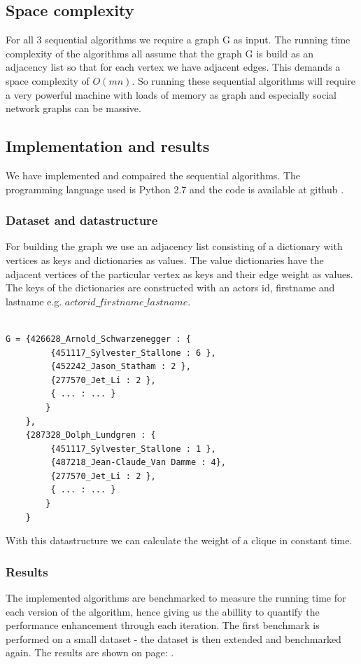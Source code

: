 \documentclass{article}
\begin{document}
\subsection{Space complexity}
For all 3 sequential algorithms we require a graph G as input. The running time complexity of the algorithms all assume that the graph G is build as an adjacency list so that for each vertex we have adjacent edges. This demands a space complexity of $O(mn)$. So running these sequential algorithms will require a very powerful machine with loads of memory as graph and especially social network graphs can be massive.


\subsection{Implementation and results}
We have implemented and compaired the sequential algorithms. The programming language used is Python 2.7 and the code is available at github \cite{gitcode}.

\subsubsection{Dataset and datastructure}
For building the graph we use an adjacency list consisting of a dictionary with vertices as keys and dictionaries as values. The value dictionaries have the adjacent vertices of the particular vertex as keys and their edge weight as values. The keys of the dictionaries are constructed with an actors id, firstname and lastname e.g. $actorid\_firstname\_lastname$.

\begin{lstlisting}

G = {426628_Arnold_Schwarzenegger : {
 		 {451117_Sylvester_Stallone : 6 },
 		 {452242_Jason_Statham : 2 },
 		 {277570_Jet_Li : 2 },
 		 { ... : ... }
 		}
 	},	
	{287328_Dolph_Lundgren : {
		 {451117_Sylvester_Stallone : 1 },
		 {487218_Jean-Claude_Van Damme : 4},
	 	 {277570_Jet_Li : 2 },
	 	 { ... : ... }
	 	}
	}
 \end{lstlisting}

With this datastructure we can calculate the weight of a clique in constant time.

\subsubsection{Results}

The implemented algorithms are benchmarked to measure the running time for each version of the algorithm, hence giving us the abillity to quantify the performance enhancement through each iteration. The first benchmark is performed on a small dataset - the dataset is then extended and benchmarked again. The results are shown on page: \pageref{result1}.\newline
\end{document}
